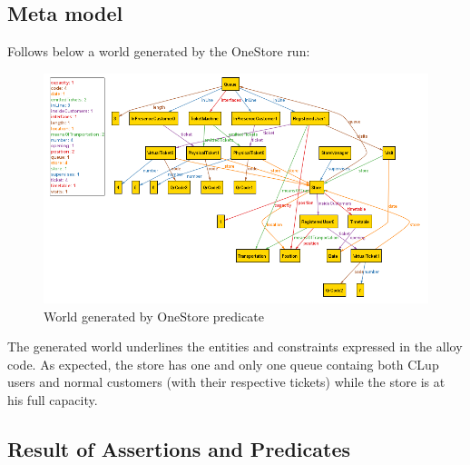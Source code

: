 \documentclass[]{article}
\begin{document}
	
	
	
	\newpage
	\subsection{Meta model}

	Follows below a world generated by the OneStore run:
	
	\begin{figure}[H]
								\centering
								\includegraphics[scale=1.038]{OneStore.png}
								\caption{World generated by OneStore predicate}
	\end{figure}
	

	The generated world underlines the entities and constraints expressed in the alloy code. \newline
	As expected, the store has one and only one queue containg both CLup users and normal customers (with their respective tickets) while the store is at his full capacity.
	\newpage
	\subsection{Result of Assertions and Predicates}
	
\end{document}
